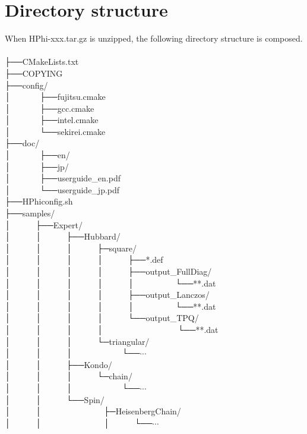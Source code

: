 \section{Directory structure}
When HPhi-xxx.tar.gz is unzipped, the following directory structure is composed.\\
\\
├──CMakeLists.txt\\
├──COPYING\\
├──config/\\
│~~~~~~~├──fujitsu.cmake\\
│~~~~~~~├──gcc.cmake\\
│~~~~~~~├──intel.cmake\\
│~~~~~~~└──sekirei.cmake\\├──doc/\\
│~~~~~~~├──en/\\
│~~~~~~~├──jp/\\
│~~~~~~~├──userguide\_en.pdf\\
│~~~~~~~└──userguide\_jp.pdf\\
├──HPhiconfig.sh\\
├──samples/\\
│~~~~~~├──Expert/\\
│~~~~~~│~~~~~~├──Hubbard/\\
│~~~~~~│~~~~~~│~~~~~~├─square/\\
│~~~~~~│~~~~~~│~~~~~~│~~~~~~├──*.def\\
│~~~~~~│~~~~~~│~~~~~~│~~~~~~├──output\_FullDiag/\\
│~~~~~~│~~~~~~│~~~~~~│~~~~~~│~~~~~~~~~~└──**.dat\\
│~~~~~~│~~~~~~│~~~~~~│~~~~~~├──output\_Lanczos/\\
│~~~~~~│~~~~~~│~~~~~~│~~~~~~│~~~~~~~~~~└──**.dat\\
│~~~~~~│~~~~~~│~~~~~~│~~~~~~└──output\_TPQ/\\
│~~~~~~│~~~~~~│~~~~~~│~~~~~~~~~~~~~~~~~~└──**.dat\\
│~~~~~~│~~~~~~│~~~~~~└─triangular/\\
│~~~~~~│~~~~~~│~~~~~~~~~~~~└──$\cdots$\\
│~~~~~~│~~~~~~├──Kondo/\\
│~~~~~~│~~~~~~│~~~~~~└─chain/\\
│~~~~~~│~~~~~~│~~~~~~~~~~~~└──$\cdots$\\
│~~~~~~│~~~~~~└──Spin/\\
│~~~~~~│~~~~~~~~~~~~~~~├─HeisenbergChain/\\
│~~~~~~│~~~~~~~~~~~~~~~│~~~~~~└──$\cdots$\\
